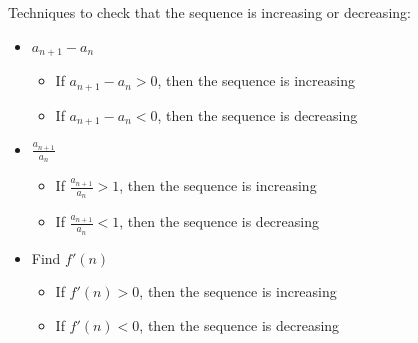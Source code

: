 \begin{remark}
  Techniques to check that the sequence is increasing or decreasing:
  \begin{itemize}
    \item \(a_{n + 1} - a_{n}\) \begin{itemize}
      \item If \(a_{n + 1} - a_{n} > 0\), then the sequence is increasing
      \item If \(a_{n + 1} - a_{n} < 0\), then the sequence is decreasing
    \end{itemize}
    \item \(\frac{a_{n + 1}}{a_n}\) \begin{itemize}
      \item If \(\frac{a_{n + 1}}{a_n} > 1\), then the sequence is increasing
      \item If \(\frac{a_{n + 1}}{a_n} < 1\), then the sequence is decreasing
    \end{itemize}
    \item Find $f'(n)$ \begin{itemize}
      \item If $f'(n) > 0$, then the sequence is increasing
      \item If $f'(n) < 0$, then the sequence is decreasing
    \end{itemize}
  \end{itemize}
\end{remark}

